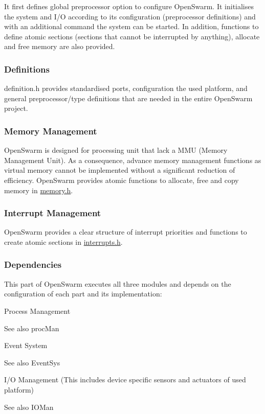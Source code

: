 It first defines global preprocessor option to configure Open\+Swarm. It initialises the system and I/\+O according to its configuration (preprocessor definitions) and with an additional command the system can be started. In addition, functions to define atomic sections (sections that cannot be interrupted by anything), allocate and free memory are also provided.\hypertarget{group__base_ssec_intro_base_defs}{}\subsubsection{Definitions}\label{group__base_ssec_intro_base_defs}
definition.\+h provides standardised ports, configuration the used platform, and general preprocessor/type definitions that are needed in the entire Open\+Swarm project.\hypertarget{group__base_ssec_intro_base_mem}{}\subsubsection{Memory Management}\label{group__base_ssec_intro_base_mem}
Open\+Swarm is designed for processing unit that lack a M\+M\+U (Memory Management Unit). As a consequence, advance memory management functions as virtual memory cannot be implemented without a significant reduction of efficiency. Open\+Swarm provides atomic functions to allocate, free and copy memory in \hyperlink{memory_8h}{memory.\+h}.\hypertarget{group__base_ssec_intro_base_irq}{}\subsubsection{Interrupt Management}\label{group__base_ssec_intro_base_irq}
Open\+Swarm provides a clear structure of interrupt priorities and functions to create atomic sections in \hyperlink{interrupts_8h}{interrupts.\+h}.\hypertarget{group__base_ssec_intro_base_deps}{}\subsubsection{Dependencies}\label{group__base_ssec_intro_base_deps}
This part of Open\+Swarm executes all three modules and depends on the configuration of each part and its implementation\+:
\begin{DoxyItemize}
\item Process Management \begin{DoxySeeAlso}{See also}
proc\+Man
\end{DoxySeeAlso}

\item Event System \begin{DoxySeeAlso}{See also}
Event\+Sys
\end{DoxySeeAlso}

\item I/\+O Management (This includes device specific sensors and actuators of used platform) \begin{DoxySeeAlso}{See also}
I\+O\+Man 
\end{DoxySeeAlso}

\end{DoxyItemize}
